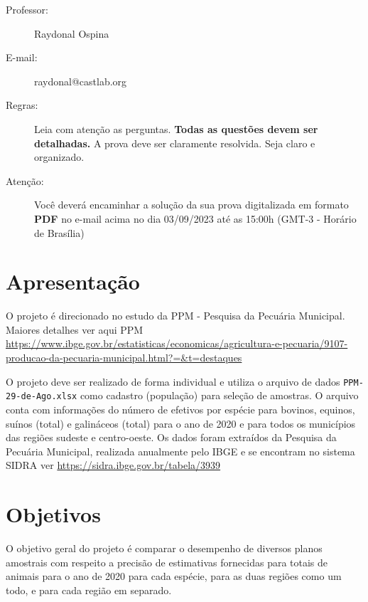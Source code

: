 \documentclass[a4paper,11pt,oneside,twocolumn]{Config/milktest}
\begin{document}
\beb
{\small
\begin{description}
\item[Professor:] Raydonal Ospina
\item[E-mail:] raydonal@castlab.org

\item[Regras:] Leia com atenção as perguntas. {\bf Todas as questões devem ser detalhadas.} A prova deve ser claramente resolvida. Seja claro e organizado. 

\item[Atenção:] Você deverá encaminhar a solução da sua prova digitalizada em formato {\bf PDF} no e-mail acima no dia 03/09/2023 até as 15:00h (GMT-3 - Horário de Brasília) 
\end{description}
}
\eeb

\balance


\section*{Apresentação}
O projeto é direcionado no estudo da  PPM - Pesquisa da Pecuária Municipal. Maiores detalhes ver aqui PPM \url{https://www.ibge.gov.br/estatisticas/economicas/agricultura-e-pecuaria/9107-producao-da-pecuaria-municipal.html?=&t=destaques}

O projeto deve ser realizado de forma individual e utiliza o arquivo de dados {\tt PPM-29-de-Ago.xlsx} como cadastro (população) para seleção de amostras. O arquivo conta com informações do número de efetivos por espécie para bovinos, equinos, suínos (total) e galináceos (total) para o ano de 2020 e para todos os municípios das regiões sudeste e centro-oeste. Os dados foram extraídos da Pesquisa da Pecuária Municipal, realizada anualmente pelo IBGE e se encontram no sistema SIDRA ver \url{https://sidra.ibge.gov.br/tabela/3939}

\section*{Objetivos}

O objetivo geral do projeto é comparar o desempenho de diversos planos amostrais com respeito a precisão de estimativas fornecidas para totais de animais para o ano de 2020 para cada espécie, para as duas regiões como um todo, e para cada região em separado.  
\end{document}
